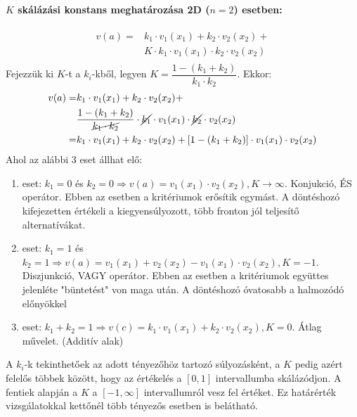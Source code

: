 \documentclass[a4paper,12pt]{article}
\begin{document}
\paragraph{$K$ skálázási konstans meghatározása 2D ($n=2$) esetben:}
\begin{equation}
\begin{split}
v(a) = & k_1\cdot v_1(x_1) + k_2\cdot v_2(x_2)+ \\
&K\cdot  k_{1}\cdot v_1(x_1)\cdot k_{2}\cdot v_2(x_2) \\
\end{split}
\end{equation}
Fejezzük ki $K$-t a $k_i$-kből, legyen $K = \dfrac{1 - (k_1 + k_2)}{k_1\cdot k_2}$. Ekkor:
\begin{equation}
\begin{split}
v(a) = & k_1\cdot v_1(x_1) + k_2\cdot v_2(x_2)+ \\
&\dfrac{1 - (k_1 + k_2)}{ \cancel{k_1\cdot k_2} } \cdot   \cancel{k_{1}}\cdot v_1(x_1)\cdot  \cancel{k_{2}}\cdot v_2(x_2) \\
= & k_1\cdot v_1(x_1) + k_2\cdot v_2(x_2)+ [1 - (k_1 + k_2)]\cdot v_1(x_1)\cdot v_2(x_2) \\
\end{split}
\end{equation}
Ahol az alábbi 3 eset állhat elő:
\begin{enumerate}
\item eset: $k_1 = 0$ és $k_2 = 0 \Rightarrow v(a) = v_1(x_1) \cdot  v_2(x_2), K \rightarrow \infty$. Konjukció, ÉS operátor.
Ebben az esetben a kritériumok erősítik egymást.
A döntéshozó kifejezetten értékeli a kiegyensúlyozott, több fronton jól teljesítő alternatívákat.
\item eset: $k_1 = 1$ és $k_2 = 1 \Rightarrow v(a) = v_1(x_1) + v_2(x_2) - v_1(x_1)\cdot  v_2(x_2), K = -1$. Diszjunkció, VAGY operátor.
Ebben az esetben a kritériumok együttes jelenléte "büntetést" von maga után.
A döntéshozó óvatosabb a halmozódó előnyökkel
\item eset: $k_1 + k_2 = 1 \Rightarrow v(c) = k_1\cdot v_1(x_1) + k_2\cdot v_2(x_2), K = 0 $. Átlag művelet. (Additív alak)
\end{enumerate} 

A $k_i$-k tekinthetőek az adott tényezőhöz tartozó súlyozásként, a $K$ pedig azért felelős többek között, hogy az értékelés a $[0,1]$ intervallumba skálázódjon. A fentiek alapján a $K$ a $[-1, \infty]$ intervallumról vesz fel értéket. Ez határérték vizsgálatokkal kettőnél több tényezős esetben is belátható.
\end{document}
